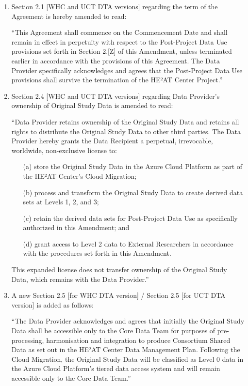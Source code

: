 \documentclass[12pt,letterpaper]{article}
\begin{document}
\begin{enumerate}
\item Section 2.1 [WHC and UCT DTA versions] regarding the term of the Agreement is hereby amended to read:

``This Agreement shall commence on the Commencement Date and shall remain in effect in perpetuity with respect to the Post-Project Data Use provisions set forth in Section 2.[Z] of this Amendment, unless terminated earlier in accordance with the provisions of this Agreement. The Data Provider specifically acknowledges and agrees that the Post-Project Data Use provisions shall survive the termination of the HE²AT Center Project.''

\item Section 2.4 [WHC and UCT DTA versions] regarding Data Provider's ownership of Original Study Data is amended to read:

``Data Provider retains ownership of the Original Study Data and retains all rights to distribute the Original Study Data to other third parties. The Data Provider hereby grants the Data Recipient a perpetual, irrevocable, worldwide, non-exclusive license to:
\begin{enumerate}
\item[(a)] store the Original Study Data in the Azure Cloud Platform as part of the HE²AT Center's Cloud Migration;
\item[(b)] process and transform the Original Study Data to create derived data sets at Levels 1, 2, and 3;
\item[(c)] retain the derived data sets for Post-Project Data Use as specifically authorized in this Amendment; and
\item[(d)] grant access to Level 2 data to External Researchers in accordance with the procedures set forth in this Amendment.
\end{enumerate}

This expanded license does not transfer ownership of the Original Study Data, which remains with the Data Provider.''

\item A new Section 2.5 [for WHC DTA version] / Section 2.5 [for UCT DTA version] is added as follows:

``The Data Provider acknowledges and agrees that initially the Original Study Data shall be accessible only to the Core Data Team for purposes of pre-processing, harmonisation and integration to produce Consortium Shared Data as set out in the HE²AT Center Data Management Plan. Following the Cloud Migration, the Original Study Data will be classified as Level 0 data in the Azure Cloud Platform's tiered data access system and will remain accessible only to the Core Data Team.''


\end{enumerate}
\end{document}
